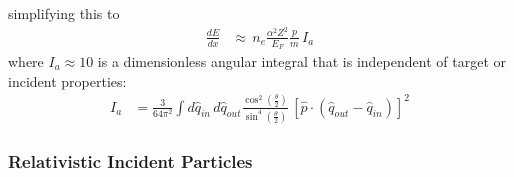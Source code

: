 \documentclass[twocolumn, preprintnumbers,amsmath,amssymb,prd, superscriptaddress]{revtex4}
\begin{document}
\begin{appendices}
simplifying this to
\begin{align}
  \frac{dE}{dx} &\approx \, n_e \frac{\alpha^2 Z^2}{E_F} \frac{p}{m} \, I_a
\end{align}
where $I_a \approx 10$ is a dimensionless angular integral that is independent of target or incident properties:
\begin{align}
   I_a &= \frac{3}{64\pi^2} \int d\hat{q}_{in} \, d\hat{q}_{out}
   \frac{\cos^2\left(\frac{\theta}{2}\right)}
        {\sin^4\left(\frac{\theta}{2}\right)}
   \, \left[\hat{p} \cdot \left(\hat{q}_{out} - \hat{q}_{in}\right)\right]^2
\end{align}

\subsubsection{Relativistic Incident Particles}


\end{appendices}
\end{document}
